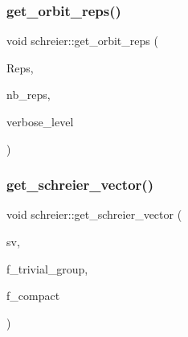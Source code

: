 \mbox{\label{classschreier_a4436afe460eedb9b88dda0f4f6613479}} 
\subsubsection{\texorpdfstring{get\+\_\+orbit\+\_\+reps()}{get\_orbit\_reps()}}
{\footnotesize\ttfamily void schreier\+::get\+\_\+orbit\+\_\+reps (\begin{DoxyParamCaption}\item[{\mbox{\hyperlink{galois_8h_a09fddde158a3a20bd2dcadb609de11dc}{I\+NT}} $\ast$\&}]{Reps,  }\item[{\mbox{\hyperlink{galois_8h_a09fddde158a3a20bd2dcadb609de11dc}{I\+NT}} \&}]{nb\+\_\+reps,  }\item[{\mbox{\hyperlink{galois_8h_a09fddde158a3a20bd2dcadb609de11dc}{I\+NT}}}]{verbose\+\_\+level }\end{DoxyParamCaption})}

\mbox{\label{classschreier_af16e96532b2a169f72b0f926c2bba898}} 
\subsubsection{\texorpdfstring{get\+\_\+schreier\+\_\+vector()}{get\_schreier\_vector()}}
{\footnotesize\ttfamily void schreier\+::get\+\_\+schreier\+\_\+vector (\begin{DoxyParamCaption}\item[{\mbox{\hyperlink{galois_8h_a09fddde158a3a20bd2dcadb609de11dc}{I\+NT}} $\ast$\&}]{sv,  }\item[{\mbox{\hyperlink{galois_8h_a09fddde158a3a20bd2dcadb609de11dc}{I\+NT}}}]{f\+\_\+trivial\+\_\+group,  }\item[{\mbox{\hyperlink{galois_8h_a09fddde158a3a20bd2dcadb609de11dc}{I\+NT}}}]{f\+\_\+compact }\end{DoxyParamCaption})}

\mbox{\label{classschreier_acea7499a4f501c208e22bfd2aacabc90}} 
